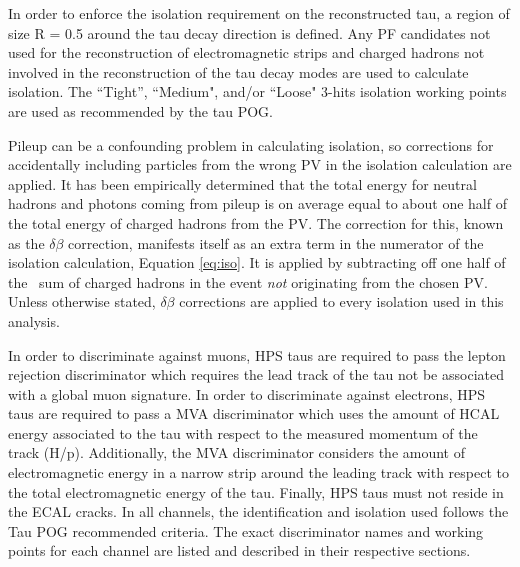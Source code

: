 In order to enforce the isolation requirement on the reconstructed tau, a region of size R = 0.5 around the tau decay  direction is defined. Any PF candidates not used for the reconstruction of electromagnetic strips and charged 
hadrons not involved in the reconstruction of the tau decay modes are used to calculate isolation. The ``Tight'', ``Medium", and/or ``Loose" 3-hits isolation working points are used as recommended by the tau POG. 

Pileup can be a confounding problem in calculating isolation, so corrections for accidentally including particles from the wrong PV in the isolation calculation are applied. It has been empirically determined that the total energy for neutral hadrons and photons coming from pileup is on average equal to about one half of the total energy of charged hadrons from the PV. The correction for this, known as the $\delta\beta$ correction, manifests itself as an extra term in the numerator of the isolation calculation, Equation \ref{eq:iso}. It is applied by subtracting off one half of the \pt ~sum of charged hadrons in the event \textit{not} originating from the chosen PV. Unless otherwise stated, $\delta\beta$ corrections are applied to every isolation used in this analysis.

In order to discriminate against muons, HPS taus are required to pass the lepton rejection 
discriminator which requires the lead track of the tau not be associated with a global muon signature. In order to 
discriminate against electrons, HPS taus are required to pass a MVA discriminator which uses the amount of HCAL energy 
associated to the tau with respect to the measured momentum of the track (H/p). Additionally, the MVA discriminator 
considers the amount of electromagnetic energy in a narrow strip around the leading track with respect to the total 
electromagnetic energy of the tau. Finally, HPS taus must not reside in the ECAL cracks. 
In all channels, the identification and isolation used follows the Tau POG recommended criteria.
The exact discriminator names and working points for each channel are listed and described in their respective sections.




